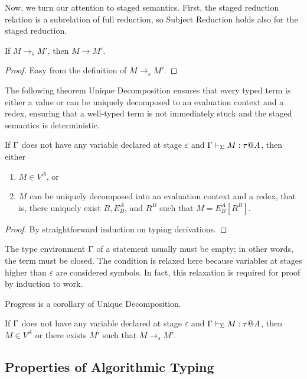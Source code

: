 Now, we turn our attention to staged semantics.  First, the staged
reduction relation is a subrelation of full reduction, so Subject
Reduction holds also for the staged reduction.

\begin{theorem}
  If $M \longrightarrow_s M'$, then $M \longrightarrow M'$.
\end{theorem}
\begin{proof}
    Easy from the definition of \( M \longrightarrow_s M' \).
\end{proof}

The following theorem Unique Decomposition ensures that every typed
term is either a value or can be uniquely decomposed to an evaluation
context and a redex, ensuring that a well-typed term is not
immediately stuck and the staged semantics is deterministic.

\begin{theorem}
  If $\Gamma$ does not have any variable declared at stage $\varepsilon$ 
  and $\Gamma \vdash_\Sigma M : \tau @ A$, then either
  \begin{enumerate}
  \item $ M \in V^A$, or
  \item $M$ can be uniquely decomposed into an evaluation context and a redex, that is, there uniquely exist $B, E^A_B$, and $R^B$ such that $M = E^A_B[R^B]$.
  \end{enumerate}
\end{theorem}

\begin{proof}
  By straightforward induction on typing derivations.
\end{proof}

The type environment $\Gamma$ of a statement usually must be empty; in other
words, the term must be closed. The condition is relaxed here because
variables at stages higher than \(\varepsilon\) are considered symbols. In
fact, this relaxation is required for proof by induction to work.

Progress is a corollary of Unique Decomposition.

\begin{theorem}[Progress]
	If $\Gamma$ does not have any variable declared at stage $\varepsilon$ and $\Gamma \vdash_\Sigma M : \tau  @ A$, then
	$ M \in V^A $ or there exists $M'$ such that $M \longrightarrow_s M'$.
\end{theorem}

\subsection{Properties of Algorithmic Typing}


